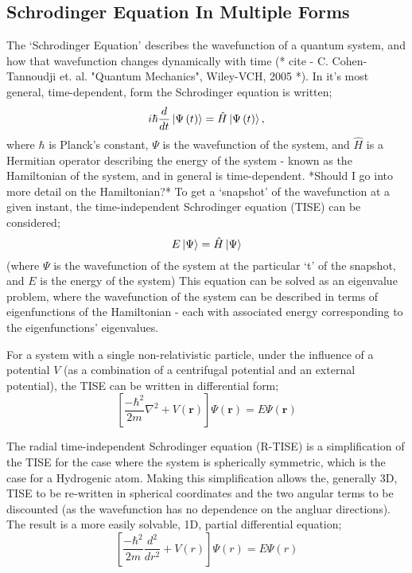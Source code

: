 \subsection{Schrodinger Equation In Multiple Forms}
The `Schrodinger Equation' describes the wavefunction of a quantum system, and how that wavefunction changes dynamically with time (* cite - C. Cohen-Tannoudji et. al. "Quantum Mechanics", Wiley-VCH, 2005 *). In it's most general, time-dependent, form the Schrodinger equation is written;
$$
i\hbar \frac{d}{dt}\ket{\Psi\left(t\right)} = \hat{H}\ket{\Psi\left(t\right)},
$$
where $\hbar$ is Planck's constant, $\Psi$ is the wavefunction of the system, and $\hat{H}$ is a Hermitian operator describing the energy of the system - known as the Hamiltonian of the system, and in general is time-dependent.\newline
*Should I go into more detail on the Hamiltonian?*
\newline
To get a `snapshot' of the wavefunction at a given instant, the time-independent Schrodinger equation (TISE) can be considered;
$$
E\ket{\Psi} = \hat{H}\ket{\Psi} 
$$
(where $\Psi$ is the wavefunction of the system at the particular `t' of the snapshot, and $E$ is the energy of the system)\newline
This equation can be solved as an eigenvalue problem, where the wavefunction of the system can be described in terms of eigenfunctions of the Hamiltonian - each with associated energy corresponding to the eigenfunctions' eigenvalues.\newline

For a system with a single non-relativistic particle, under the influence of a potential $V$ (as a combination of a centrifugal potential and an external potential), the TISE can be written in differential form;
$$
\left[\frac{-\hbar^{2}}{2m}\nabla^{2} + V\left(\mathbf{r}\right)\right] \Psi\left(\mathbf{r}\right) = E\Psi\left(\mathbf{r}\right)
$$

The radial time-independent Schrodinger equation (R-TISE) is a simplification of the TISE for the case where the system is spherically symmetric, which is the case for a Hydrogenic atom.%
Making this simplification allows the, generally 3D, TISE to be re-written in spherical coordinates and the two angular terms to be discounted (as the wavefunction has no dependence on the angluar directions). The result is a more easily solvable, 1D, partial differential equation;
$$
\left[\frac{-\hbar^{2}}{2m}\frac{d^2}{dr^2} + V\left(r\right)\right] \Psi\left(r\right) = E\Psi\left(r\right)
$$

